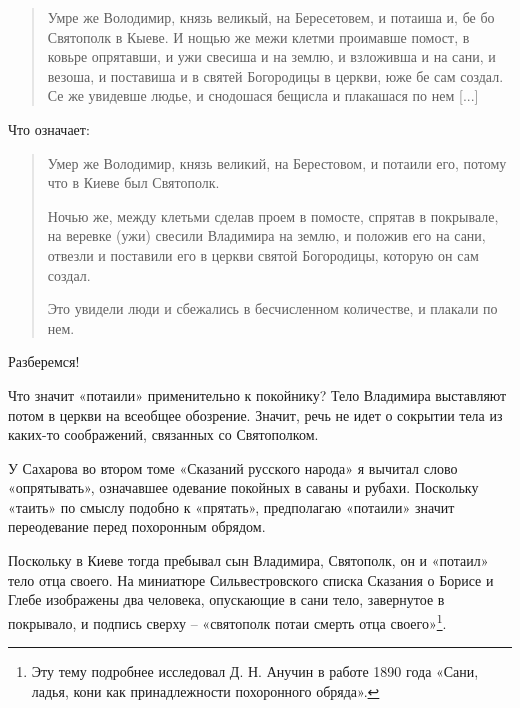 \begin{quotation}
Умре же Володимир, князь великый, на Бересетовем, и потаиша и, бе бо Святополк в Кыеве. И нощью же межи клетми проимавше помост, в ковьре опрятавши, и ужи свесиша и на землю, и взложивша и на сани, и везоша, и поставиша и в святей Богородицы в церкви, юже бе сам создал. Се же увидевше людье, и снодошася бещисла и плакашася по нем [...]
\end{quotation}

Что означает:

\begin{quotation}
Умер же Володимир, князь великий, на Берестовом, и потаили его, потому что в Киеве был Святополк. 

Ночью же, между клетьми сделав проем в помосте, спрятав в покрывале, на веревке (ужи) свесили Владимира на землю, и положив его на сани, отвезли и поставили его в церкви святой Богородицы, которую он сам создал.

Это увидели люди и сбежались в бесчисленном количестве, и плакали по нем.
\end{quotation}

Разберемся!

Что значит «потаили» применительно к покойнику? Тело Владимира выставляют потом в церкви на всеобщее обозрение. Значит, речь не идет о сокрытии тела из каких-то соображений, связанных со Святополком.

У Сахарова во втором томе «Сказаний русского народа» я вычитал слово «опрятывать», означавшее одевание покойных в саваны и рубахи. Поскольку «таить» по смыслу подобно к «прятать», предполагаю «потаили» значит переодевание перед похоронным обрядом.


Поскольку в Киеве тогда пребывал сын Владимира, Святополк, он и «потаил» тело отца своего. На миниатюре Сильвестровского списка Сказания о Борисе и Глебе изображены два человека, опускающие в сани тело, завернутое в покрывало, и подпись сверху – «святополк потаи смерть отца своего»\footnote{Эту тему подробнее исследовал Д. Н. Анучин в работе 1890 года «Сани, ладья, кони как принадлежности похоронного обряда».}. 

